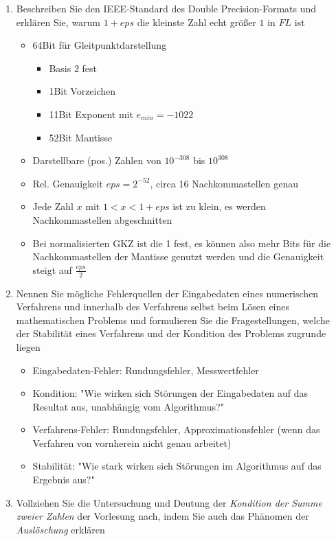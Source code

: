\documentclass[]{article}
\begin{document}
\begin{enumerate}
	\item Beschreiben Sie den IEEE-Standard des Double Precision-Formats und erklären Sie, warum $1+eps$ die kleinste Zahl echt größer $1$ in $FL$ ist
		\begin{itemize}
			\item 64Bit für Gleitpunktdarstellung
				\begin{itemize}
					\item Basis $2$ fest
					\item 1Bit Vorzeichen
					\item 11Bit Exponent mit $e_{min} = -1022$
					\item 52Bit Mantisse
				\end{itemize}
			\item Darstellbare (pos.) Zahlen von $10^{-308}$ bis $10^{308}$
			\item Rel. Genauigkeit $eps = 2^{-52}$, circa 16 Nachkommastellen genau
			\item Jede Zahl $x$ mit $1 < x < 1+eps$ ist zu klein, es werden Nachkommastellen abgeschnitten
			\item Bei normalisierten GKZ ist die 1 fest, es können also mehr Bits für die Nachkommastellen der Mantisse genutzt werden und die Genauigkeit steigt auf $\frac{eps}{2}$
		\end{itemize}
	\item Nennen Sie mögliche Fehlerquellen der Eingabedaten eines numerischen Verfahrens und innerhalb des Verfahrens selbst beim Lösen eines mathematischen Problems und formulieren Sie die Fragestellungen, welche der Stabilität eines Verfahrens und der Kondition des Problems zugrunde liegen
		\begin{itemize}
			\item Eingabedaten-Fehler: Rundungsfehler, Messwertfehler
			\item Kondition: "Wie wirken sich Störungen der Eingabedaten auf das Resultat aus, unabhängig vom Algorithmus?"
			\item Verfahrens-Fehler: Rundungsfehler, Approximationsfehler (wenn das Verfahren von vornherein nicht genau arbeitet)
			\item Stabilität: "Wie stark wirken sich Störungen im Algorithmus auf das Ergebnis aus?"
		\end{itemize}
	\item Vollziehen Sie die Untersuchung und Deutung der \textit{Kondition der Summe zweier Zahlen} der Vorlesung nach, indem Sie auch das Phänomen der \textit{Auslöschung} erklären \\

\end{enumerate}
\end{document}
